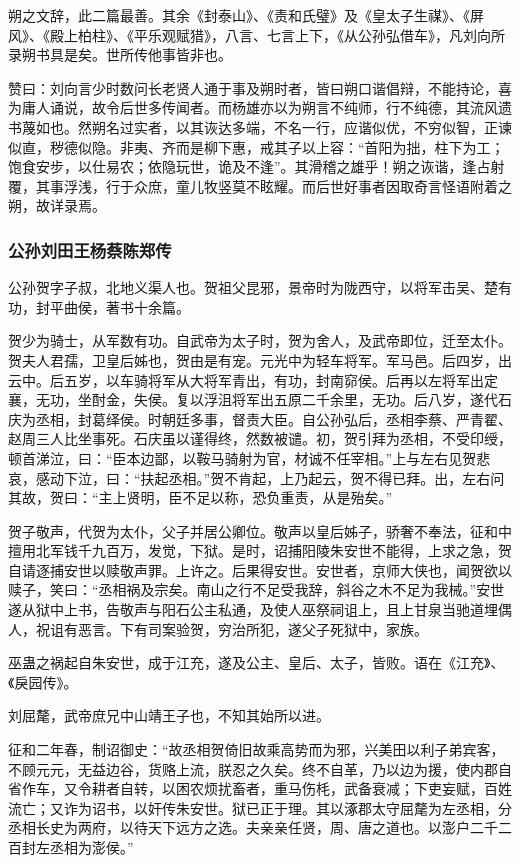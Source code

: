\documentclass[]{article}
\begin{document}
朔之文辞，此二篇最善。其余《封泰山》、《责和氏璧》及《皇太子生禖》、《屏风》、《殿上柏柱》、《平乐观赋猎》，八言、七言上下，《从公孙弘借车》，凡刘向所录朔书具是矣。世所传他事皆非也。

赞曰：刘向言少时数问长老贤人通于事及朔时者，皆曰朔口谐倡辩，不能持论，喜为庸人诵说，故令后世多传闻者。而杨雄亦以为朔言不纯师，行不纯德，其流风遗书蔑如也。然朔名过实者，以其诙达多端，不名一行，应谐似优，不穷似智，正谏似直，秽德似隐。非夷、齐而是柳下惠，戒其子以上容：``首阳为拙，柱下为工；饱食安步，以仕易农；依隐玩世，诡及不逢''。其滑稽之雄乎！朔之诙谐，逢占射覆，其事浮浅，行于众庶，童儿牧竖莫不眩耀。而后世好事者因取奇言怪语附着之朔，故详录焉。

\hypertarget{header-n4953}{%
\subsubsection{公孙刘田王杨蔡陈郑传}\label{header-n4953}}

公孙贺字子叔，北地义渠人也。贺祖父昆邪，景帝时为陇西守，以将军击吴、楚有功，封平曲侯，著书十余篇。

贺少为骑士，从军数有功。自武帝为太子时，贺为舍人，及武帝即位，迁至太仆。贺夫人君孺，卫皇后姊也，贺由是有宠。元光中为轻车将军。军马邑。后四岁，出云中。后五岁，以车骑将军从大将军青出，有功，封南窌侯。后再以左将军出定襄，无功，坐酎金，失侯。复以浮沮将军出五原二千余里，无功。后八岁，遂代石庆为丞相，封葛绎侯。时朝廷多事，督责大臣。自公孙弘后，丞相李蔡、严青翟、赵周三人比坐事死。石庆虽以谨得终，然数被谴。初，贺引拜为丞相，不受印绶，顿首涕泣，曰：``臣本边鄙，以鞍马骑射为官，材诚不任宰相。''上与左右见贺悲哀，感动下泣，曰：``扶起丞相。''贺不肯起，上乃起云，贺不得已拜。出，左右问其故，贺曰：``主上贤明，臣不足以称，恐负重责，从是殆矣。''

贺子敬声，代贺为太仆，父子并居公卿位。敬声以皇后姊子，骄奢不奉法，征和中擅用北军钱千九百万，发觉，下狱。是时，诏捕阳陵朱安世不能得，上求之急，贺自请逐捕安世以赎敬声罪。上许之。后果得安世。安世者，京师大侠也，闻贺欲以赎子，笑曰：``丞相祸及宗矣。南山之行不足受我辞，斜谷之木不足为我械。''安世遂从狱中上书，告敬声与阳石公主私通，及使人巫祭祠诅上，且上甘泉当驰道埋偶人，祝诅有恶言。下有司案验贺，穷治所犯，遂父子死狱中，家族。

巫蛊之祸起自朱安世，成于江充，遂及公主、皇后、太子，皆败。语在《江充》、《戾园传》。

刘屈氂，武帝庶兄中山靖王子也，不知其始所以进。

征和二年春，制诏御史：``故丞相贺倚旧故乘高势而为邪，兴美田以利子弟宾客，不顾元元，无益边谷，货赂上流，朕忍之久矣。终不自革，乃以边为援，使内郡自省作车，又令耕者自转，以困农烦扰畜者，重马伤枆，武备衰减；下吏妄赋，百姓流亡；又诈为诏书，以奸传朱安世。狱已正于理。其以涿郡太守屈氂为左丞相，分丞相长史为两府，以待天下远方之选。夫亲亲任贤，周、唐之道也。以澎户二千二百封左丞相为澎侯。''
\end{document}

